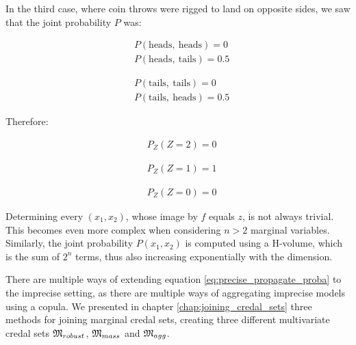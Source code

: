\begin{example}
    In the third case, where coin throws were rigged to land on opposite sides, we saw that the joint probability $P$ was:\\
    \noindent\begin{minipage}[b]{0.5\linewidth}
    \begin{align*}
        & P(\text{heads}, ~\text{heads}) = 0\\
        & P(\text{heads}, ~\text{tails}) = 0.5
    \end{align*}
    \end{minipage}
    \begin{minipage}[b]{0.5\linewidth}
    \begin{align*}
        & P(\text{tails}, ~\text{tails}) = 0\\
        & P(\text{tails}, ~\text{heads}) = 0.5
    \end{align*}
    \end{minipage}
    Therefore:\\
    \begin{minipage}[b]{0.33\linewidth}
    \begin{align*}
        & P_Z(Z=2) = 0
    \end{align*}
    \end{minipage}
    \begin{minipage}[b]{0.33\linewidth}
    \begin{align*}
        & P_Z(Z=1) = 1
    \end{align*}
    \end{minipage}
    \begin{minipage}[b]{0.33\linewidth}
    \begin{align*}
        & P_Z(Z=0) = 0
    \end{align*}
    \end{minipage}
\end{example}

Determining every $(x_1, x_2)$, whose image by $f$ equals $z$, is not always trivial. This becomes even more complex when considering $n>2$ marginal variables. Similarly, the joint probability $P(x_1,x_2)$ is computed using a H-volume, which is the sum of $2^n$ terms, thus also increasing exponentially with the dimension.

There are multiple ways of extending equation \eqref{eq:precise_propagate_proba} to the imprecise setting, as there are multiple ways of aggregating imprecise models using a copula. We presented in chapter \ref{chap:joining_credal_sets} three methods for joining marginal credal sets, creating three different multivariate credal sets ${\mathfrak{M}}_{robust}$, ${\mathfrak{M}}_{mass}$ and ${\mathfrak{M}}_{agg}$.

